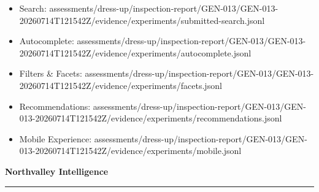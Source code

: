 \documentclass[10pt]{article}
\newcommand{\ReportFine}[1]{{\fontsize{7.6}{9.1}\selectfont\color{NVIMuted}#1}}
\begin{document}
\begin{itemize}
\item \ReportFine{Search: assessments/dress-up/inspection-report/GEN-013/GEN-013-20260714T121542Z/evidence/experiments/submitted-search.jsonl}
\item \ReportFine{Autocomplete: assessments/dress-up/inspection-report/GEN-013/GEN-013-20260714T121542Z/evidence/experiments/autocomplete.jsonl}
\item \ReportFine{Filters \& Facets: assessments/dress-up/inspection-report/GEN-013/GEN-013-20260714T121542Z/evidence/experiments/facets.jsonl}
\item \ReportFine{Recommendations: assessments/dress-up/inspection-report/GEN-013/GEN-013-20260714T121542Z/evidence/experiments/recommendations.jsonl}
\item \ReportFine{Mobile Experience: assessments/dress-up/inspection-report/GEN-013/GEN-013-20260714T121542Z/evidence/experiments/mobile.jsonl}
\end{itemize}
\vfill
\begin{center}
{\fontsize{16}{19}\selectfont\bfseries\color{NVIInk}Northvalley Intelligence}\\[0.06in]
{\color{NVIAccent}\rule{2.2in}{0.8pt}}\\[0.08in]
\ReportFine{\NorthvalleyContactLine}
\end{center}
\end{document}

